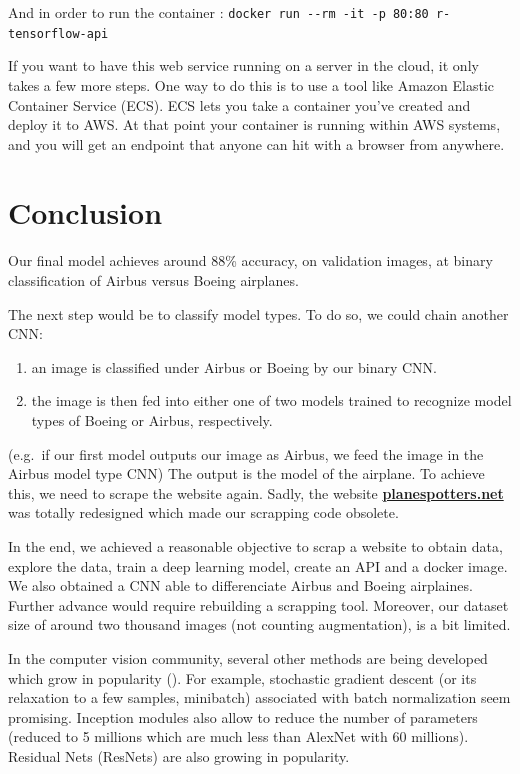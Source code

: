 \documentclass[]{book}
\providecommand{\tightlist}{%
  \setlength{\itemsep}{0pt}\setlength{\parskip}{0pt}}
\begin{document}
And in order to run the container :
\texttt{docker\ run\ -\/-rm\ -it\ -p\ 80:80\ r-tensorflow-api}

If you want to have this web service running on a server in the cloud, it only takes a few more steps. One way to do this is to use a tool like Amazon Elastic Container Service (ECS). ECS lets you take a container you've created and deploy it to AWS. At that point your container is running within AWS systems, and you will get an endpoint that anyone can hit with a browser from anywhere.

\hypertarget{conclusion}{%
\chapter{Conclusion}\label{conclusion}}

Our final model achieves around 88\% accuracy, on validation images, at binary classification of Airbus versus Boeing airplanes.

The next step would be to classify model types.
To do so, we could chain another CNN:

\begin{enumerate}
\def\labelenumi{\arabic{enumi}.}
\tightlist
\item
  an image is classified under Airbus or Boeing by our binary CNN.
\item
  the image is then fed into either one of two models trained to recognize model types of Boeing or Airbus, respectively.
\end{enumerate}

(e.g.~if our first model outputs our image as Airbus, we feed the image in the Airbus model type CNN)
The output is the model of the airplane. To achieve this, we need to scrape the website again.
Sadly, the website \href{https://www.planespotters.net/}{\textbf{planespotters.net}} was totally redesigned which made our scrapping code obsolete.

In the end, we achieved a reasonable objective to scrap a website to obtain data, explore the data, train a deep learning model, create an API and a docker image.
We also obtained a CNN able to differenciate Airbus and Boeing airplaines.
Further advance would require rebuilding a scrapping tool.
Moreover, our dataset size of around two thousand images (not counting augmentation), is a bit limited.

In the computer vision community, several other methods are being developed which grow in popularity (\citet{DBLP:journals/corr/GuWKMSSLWW15}).
For example, stochastic gradient descent (or its relaxation to a few samples, minibatch) associated with batch normalization seem promising.
Inception modules also allow to reduce the number of parameters (reduced to 5 millions which are much less than AlexNet with 60 millions).
Residual Nets (ResNets) are also growing in popularity.


\end{document}
